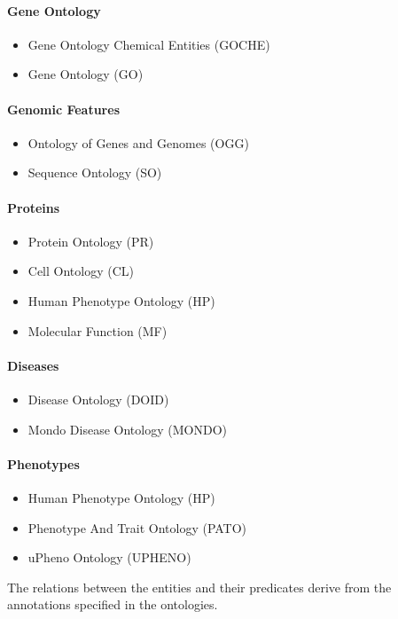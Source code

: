 \begin{multicols}{2}

\paragraph{Gene Ontology}
\begin{itemize}
\item Gene Ontology Chemical Entities (GOCHE)
\item Gene Ontology (GO)
\end{itemize}

\paragraph{Genomic Features}
\begin{itemize}
\item Ontology of Genes and Genomes (OGG)
\item Sequence Ontology (SO)
\end{itemize}

\paragraph{Proteins}
\begin{itemize}
\item Protein Ontology (PR)
\item Cell Ontology (CL)
\item Human Phenotype Ontology (HP)
\item Molecular Function (MF)
\end{itemize}
\bigskip

\paragraph{Diseases}
\begin{itemize}
\item Disease Ontology (DOID)
\item Mondo Disease Ontology (MONDO)
\end{itemize}
\bigskip

\paragraph{Phenotypes}
\begin{itemize}
\item Human Phenotype Ontology (HP)
\item Phenotype And Trait Ontology (PATO)
\item uPheno Ontology (UPHENO)
\end{itemize}
\end{multicols}



The relations between the entities and their predicates derive from the annotations specified in the ontologies.

